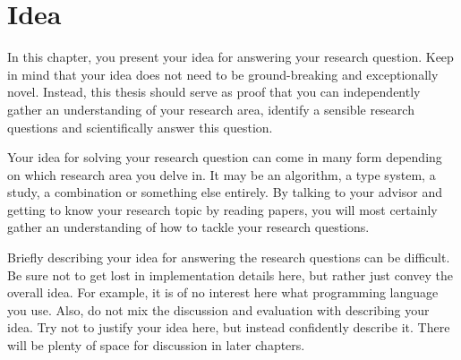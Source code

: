\chapter{Idea}\label{ch:Idea}
In this chapter, you present your idea for answering your research question.
Keep in mind that your idea does not need to be ground-breaking and exceptionally novel. 
Instead, this thesis should serve as proof that you can independently gather an understanding of your research area, identify a sensible research questions and scientifically answer this question.

Your idea for solving your research question can come in many form depending on which research area you delve in.
It may be an algorithm, a type system, a study, a combination or something else entirely.
By talking to your advisor and getting to know your research topic by reading papers, you will most certainly gather an understanding of how to tackle your research questions.

Briefly describing your idea for answering the research questions can be difficult.
Be sure not to get lost in implementation details here, but rather just convey the overall idea. 
For example, it is of no interest here what programming language you use.
Also, do not mix the discussion and evaluation with describing your idea.
Try not to justify your idea here, but instead confidently describe it.
There will be plenty of space for discussion in later chapters. 
